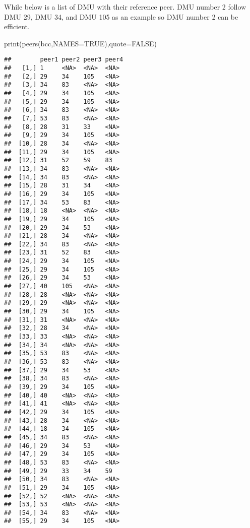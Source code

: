 \documentclass[
]{article}
\newenvironment{Shaded}{\begin{snugshade}}{\end{snugshade}}
\newcommand{\AttributeTok}[1]{\textcolor[rgb]{0.77,0.63,0.00}{#1}}
\newcommand{\ConstantTok}[1]{\textcolor[rgb]{0.00,0.00,0.00}{#1}}
\newcommand{\FunctionTok}[1]{\textcolor[rgb]{0.00,0.00,0.00}{#1}}
\newcommand{\NormalTok}[1]{#1}
\begin{document}
While below is a list of DMU with their reference peer. DMU number 2
follow DMU 29, DMU 34, and DMU 105 as an example so DMU number 2 can be
efficient.

\begin{Shaded}
\begin{Highlighting}[]
\FunctionTok{print}\NormalTok{(}\FunctionTok{peers}\NormalTok{(bcc,}\AttributeTok{NAMES=}\ConstantTok{TRUE}\NormalTok{),}\AttributeTok{quote=}\ConstantTok{FALSE}\NormalTok{)}
\end{Highlighting}
\end{Shaded}

\begin{verbatim}
##        peer1 peer2 peer3 peer4
##   [1,] 1     <NA>  <NA>  <NA> 
##   [2,] 29    34    105   <NA> 
##   [3,] 34    83    <NA>  <NA> 
##   [4,] 29    34    105   <NA> 
##   [5,] 29    34    105   <NA> 
##   [6,] 34    83    <NA>  <NA> 
##   [7,] 53    83    <NA>  <NA> 
##   [8,] 28    31    33    <NA> 
##   [9,] 29    34    105   <NA> 
##  [10,] 28    34    <NA>  <NA> 
##  [11,] 29    34    105   <NA> 
##  [12,] 31    52    59    83   
##  [13,] 34    83    <NA>  <NA> 
##  [14,] 34    83    <NA>  <NA> 
##  [15,] 28    31    34    <NA> 
##  [16,] 29    34    105   <NA> 
##  [17,] 34    53    83    <NA> 
##  [18,] 18    <NA>  <NA>  <NA> 
##  [19,] 29    34    105   <NA> 
##  [20,] 29    34    53    <NA> 
##  [21,] 28    34    <NA>  <NA> 
##  [22,] 34    83    <NA>  <NA> 
##  [23,] 31    52    83    <NA> 
##  [24,] 29    34    105   <NA> 
##  [25,] 29    34    105   <NA> 
##  [26,] 29    34    53    <NA> 
##  [27,] 40    105   <NA>  <NA> 
##  [28,] 28    <NA>  <NA>  <NA> 
##  [29,] 29    <NA>  <NA>  <NA> 
##  [30,] 29    34    105   <NA> 
##  [31,] 31    <NA>  <NA>  <NA> 
##  [32,] 28    34    <NA>  <NA> 
##  [33,] 33    <NA>  <NA>  <NA> 
##  [34,] 34    <NA>  <NA>  <NA> 
##  [35,] 53    83    <NA>  <NA> 
##  [36,] 53    83    <NA>  <NA> 
##  [37,] 29    34    53    <NA> 
##  [38,] 34    83    <NA>  <NA> 
##  [39,] 29    34    105   <NA> 
##  [40,] 40    <NA>  <NA>  <NA> 
##  [41,] 41    <NA>  <NA>  <NA> 
##  [42,] 29    34    105   <NA> 
##  [43,] 28    34    <NA>  <NA> 
##  [44,] 18    34    105   <NA> 
##  [45,] 34    83    <NA>  <NA> 
##  [46,] 29    34    53    <NA> 
##  [47,] 29    34    105   <NA> 
##  [48,] 53    83    <NA>  <NA> 
##  [49,] 29    33    34    59   
##  [50,] 34    83    <NA>  <NA> 
##  [51,] 29    34    105   <NA> 
##  [52,] 52    <NA>  <NA>  <NA> 
##  [53,] 53    <NA>  <NA>  <NA> 
##  [54,] 34    83    <NA>  <NA> 
##  [55,] 29    34    105   <NA> 

\end{verbatim}
\end{document}
